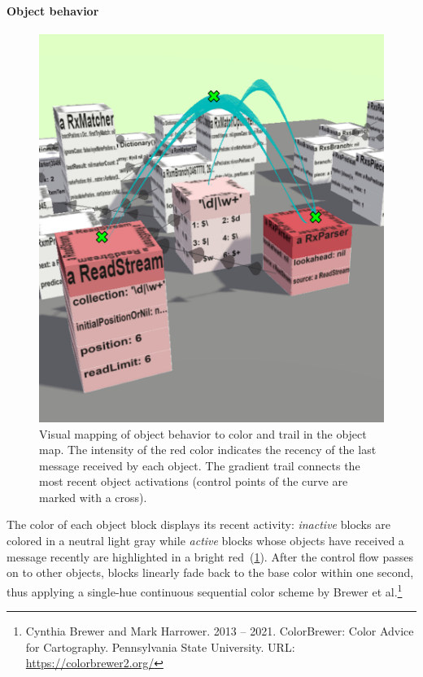 \paragraph{Object behavior}
\label{sec:visualization_approach/mapping/object_behavior}

\begin{figure}
	\includegraphics[width=\linewidth]{sections/03_visualization_approach/mapping/object_behavior}
	\caption{
		Visual mapping of object behavior to color and trail in the object map.
		The intensity of the red color indicates the recency of the last message received by each object.
		The gradient trail connects the most recent object activations (control points of the curve are marked with a \protect{} cross).
	}
	\label{fig:visualization_approach/mapping/object_behavior}
\end{figure}

The color of each object block displays its recent activity:
\emph{inactive} blocks are colored in a neutral light gray while \emph{active} blocks whose objects have received a message recently are highlighted in a bright red~(\cref{fig:visualization_approach/mapping/object_behavior}).
After the control flow passes on to other objects, blocks linearly fade back to the base color within one second, thus applying a single-hue continuous sequential color scheme by Brewer et al.\footnote{Cynthia Brewer and Mark Harrower. 2013 -- 2021. ColorBrewer: Color Advice for Cartography. Pennsylvania State University. \textsc{URL}: \url{https://colorbrewer2.org/}}

